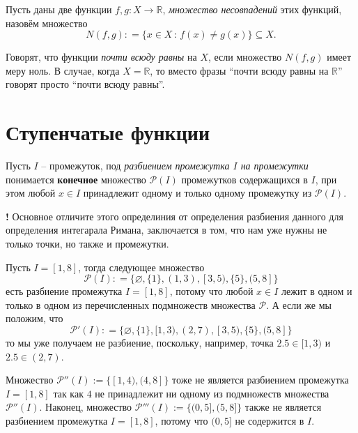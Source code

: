 \begin{definition}
 Пусть даны две функции $f,g: X \to \mathbb{R}$, \textit{множество несовпадений} этих функций, назовём множество
 \[
  N(f,g): = \{x\in X\, :\, f(x) \ne g(x)\} \subseteq X.
 \]

 Говорят, что функции \textit{почти всюду равны} на $X$, если множество $N(f,g)$ имеет меру ноль. В случае, когда $X = \mathbb{R}$, то вместо фразы ``почти всюду равны на $\mathbb{R}$'' говорят просто ``почти всюду равны''.
\end{definition}



\section{Ступенчатые функции}


\begin{definition}
    Пусть $I$ -- промежуток, под \textit{разбиением промежутка $I$ на промежутки} понимается \textbf{конечное} множество $\mathscr{P}(I)$ промежутков содержащихся в $I$, при этом любой $x \in I$ принадлежит одному и только одному промежутку из $\mathscr{P}(I).$
\end{definition}

\begin{mydanger}{\bf !}
    Основное отличите этого определиния от определения разбиения данного для определения интегарала Римана, заключается в том, что нам уже нужны не только точки, но также и промежутки. 
\end{mydanger}

\begin{example}
  Пусть $I = [1,8]$, тогда следующее множество
  \[
   \mathscr{P}(I) : = \{ \varnothing, \{1\}, (1,3), [3,5), \{5\}, (5,8]  \}
  \]
есть разбиение промежутка $I = [1,8]$, потому что любой $x \in I$ лежит в одном и только в одном из перечисленных подмножеств множества $\mathscr{P}$. А если же мы положим, что
\[
 \mathscr{P}'(I): = \{ \varnothing, \{1\}, [1,3), (2,7), [3,5), \{5\}, (5,8] \}
\]
то мы уже получаем не разбиение, поскольку, например, точка $2.5 \in [1,3)$ и $2.5 \in (2,7)$.

Множество $\mathscr{P}''(I) := \{[1,4), (4,8]\}$ тоже не является разбиением промежутка $I = [1,8]$ так как $4$ не принадлежит ни одному из подмножеств множества $\mathscr{P}''(I)$. Наконец, множество $\mathscr{P}'''(I) := \{(0,5], (5,8]\}$ также не является разбиением промежутка $I = [1,8]$, потому что $(0,5]$ не содержится в $I.$
\end{example}

